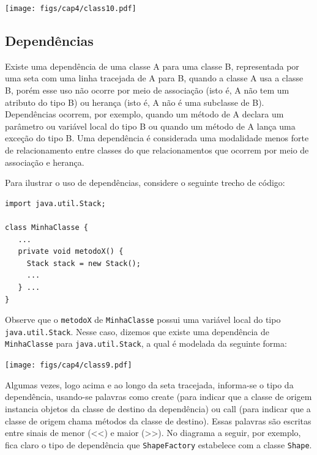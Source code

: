 \documentclass[
  11pt,
  twoside]{book}
\newcommand{\passthrough}[1]{#1}
\begin{document}
\texttt{[image: figs/cap4/class10.pdf]}

\hypertarget{dependuxeancias}{%
\subsection*{Dependências}\label{dependuxeancias}}


Existe uma dependência de uma classe A para uma classe B, representada
por uma seta com uma linha tracejada de A para B, quando a classe A usa
a classe B, porém esse uso não ocorre por meio de associação (isto é, A
não tem um atributo do tipo B) ou herança (isto é, A não é uma subclasse
de B). Dependências ocorrem, por exemplo, quando um método de A declara
um parâmetro ou variável local do tipo B ou quando um método de A lança
uma exceção do tipo B. Uma dependência é considerada uma modalidade
menos forte de relacionamento entre classes do que relacionamentos que
ocorrem por meio de associação e herança.

Para ilustrar o uso de dependências, considere o seguinte trecho de
código:

\begin{lstlisting}
import java.util.Stack;

class MinhaClasse {
   ...
   private void metodoX() {
     Stack stack = new Stack();
     ...
   } ...
}
\end{lstlisting}

Observe que o \passthrough{\lstinline!metodoX!} de
\passthrough{\lstinline!MinhaClasse!} possui uma variável local do tipo
\passthrough{\lstinline!java.util.Stack!}. Nesse caso, dizemos que
existe uma dependência de \passthrough{\lstinline!MinhaClasse!} para
\passthrough{\lstinline!java.util.Stack!}, a qual é modelada da seguinte
forma:

\texttt{[image: figs/cap4/class9.pdf]}

Algumas vezes, logo acima e ao longo da seta tracejada, informa-se o
tipo da dependência, usando-se palavras como create (para indicar que a
classe de origem instancia objetos da classe de destino da dependência)
ou call (para indicar que a classe de origem chama métodos da classe de
destino). Essas palavras são escritas entre sinais de menor
(\textless\textless) e maior (\textgreater\textgreater). No diagrama a
seguir, por exemplo, fica claro o tipo de dependência que
\passthrough{\lstinline!ShapeFactory!} estabelece com a classe
\passthrough{\lstinline!Shape!}.
\end{document}
